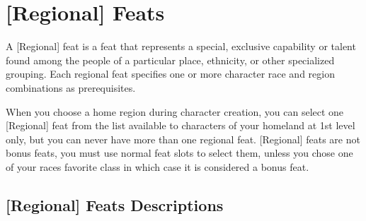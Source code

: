 \section{[Regional] Feats}

A [Regional] feat is a feat that represents a special, exclusive capability or talent found among the people of a particular place, ethnicity, or other specialized grouping. Each regional feat specifies one or more character race and region combinations as prerequisites.

When you choose a home region during character creation, you can select one [Regional] feat from the list available to characters of your homeland at 1st level only, but you can never have more than one regional feat. [Regional] feats are not bonus feats, you must use normal feat slots to select them, unless you chose one of your races favorite class in which case it is considered a bonus feat.

\subsection{[Regional] Feats Descriptions}


























































